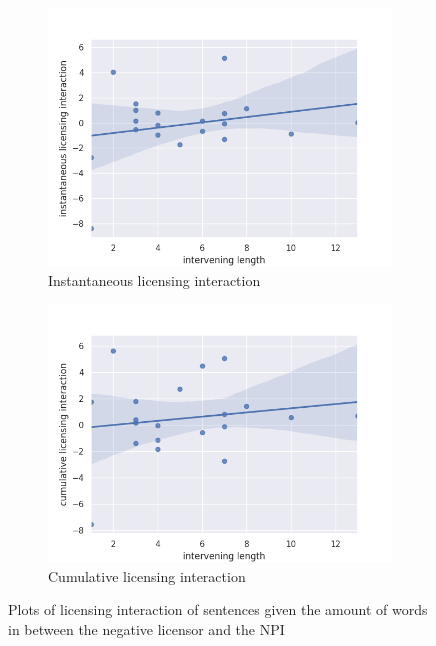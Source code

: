 \documentclass[11pt, round]{article}
\begin{document}
\begin{figure}
    \centering
    \begin{subfigure}[b]{0.45\textwidth}
        \centering
        \includegraphics[width=\textwidth]{intervening_pnt_scatter}
        \caption{Instantaneous licensing interaction}
    \end{subfigure}
    \hfill
    \begin{subfigure}[b]{0.45\textwidth}
        \centering
        \includegraphics[width=\textwidth]{intervening_cum_scatter}
        \caption{Cumulative licensing interaction}
    \end{subfigure}
    \caption{Plots of licensing interaction of sentences given the amount of words in between the negative licensor and the NPI}
    \label{fig:intervening1}
\end{figure}
\end{document}
